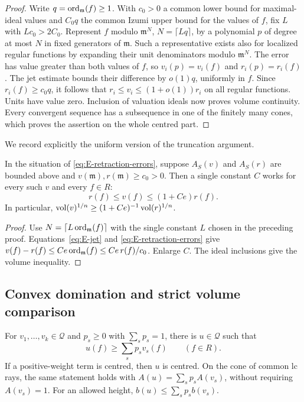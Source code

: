 \begin{proof}
Write $q=\operatorname{ord}_{\mathfrak m}(f)\ge1$. With $c_0>0$ a common lower bound
for maximal-ideal values and $C_0q$ the common Izumi upper bound for
the values of $f$, fix $L$ with $Lc_0>2C_0$. Represent $f$ modulo
$\mathfrak m^{N}$, $N=\lceil Lq\rceil$, by a polynomial $p$ of degree
at most $N$ in fixed generators of $\mathfrak m$. Such a representative
exists also for localized regular functions by expanding their unit
denominators modulo $\mathfrak m^N$. The error has value greater than
both values of $f$, so $v_i(p)=v_i(f)$ and $r_i(p)=r_i(f)$.
The jet estimate bounds their difference by $o(1)q$, uniformly in $f$.
Since $r_i(f)\ge c_0q$, it follows that
$r_i\le v_i\le(1+o(1))r_i$ on all regular functions. Units have value
zero. Inclusion of valuation ideals now proves volume continuity.
Every convergent sequence has a subsequence in one of the finitely
many cones, which proves the assertion on the whole centred part.
\end{proof}

We record explicitly the uniform version of the truncation argument.
\begin{corollary}\label{cor:E-all-functions}
In the situation of \eqref{eq:E-retraction-errors}, suppose
$A_S(v)$ and $A_S(r)$ are bounded above and
$v(\mathfrak m),r(\mathfrak m)\ge c_0>0$. Then a single constant $C$
works for every such $v$ and every $f\in R$:
\begin{equation}\label{eq:E-all-functions}
 r(f)\le v(f)\le(1+Ce)r(f).
\end{equation}
In particular,
$\operatorname{vol}(v)^{1/n}\ge(1+Ce)^{-1}\operatorname{vol}(r)^{1/n}$.
\end{corollary}
\begin{proof}
Use $N=\lceil L\operatorname{ord}_{\mathfrak m}(f)\rceil$ with the single constant
$L$ chosen in the preceding proof. Equations~\eqref{eq:E-jet} and
\eqref{eq:E-retraction-errors} give
$v(f)-r(f)\le C e\operatorname{ord}_{\mathfrak m}(f)\le Ce\,r(f)/c_0$.
Enlarge $C$. The ideal inclusions give the volume inequality.
\end{proof}

\subsection{Convex domination and strict volume comparison}

\begin{lemma}\label{lem:E-convexity}
For $v_1,\ldots,v_k\in\mathcal Q$ and $p_s\ge0$ with
$\sum_s p_s=1$, there is $u\in\mathcal Q$ such that
\begin{equation}\label{eq:E-convexity}
 u(f)\ge\sum_s p_s v_s(f)\qquad(f\in R).
\end{equation}
If a positive-weight term is centred, then $u$ is centred. On the cone
of common lc rays, the same statement holds with
$A(u)=\sum_s p_sA(v_s)$, without requiring $A(v_s)=1$.
For an allowed height,
$b(u)\le\sum_s p_sb(v_s)$.
\end{lemma}

